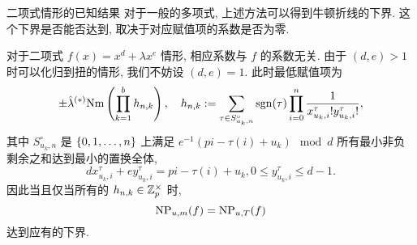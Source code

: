 \documentclass[aspectratio=169,handout]{ctexbeamer}
\newcommand\ldb{\llbracket}
\newcommand\rdb{\rrbracket}
\begin{document}



\begin{frame}{二项式情形的已知结果}
对于一般的多项式, 上述方法可以得到牛顿折线的下界.
这个下界是否能否达到, 取决于对应赋值项的系数是否为零.

对于二项式 $f(x)=x^d+\lambda x^e$ 情形, 相应系数与 $f$ 的系数无关.
由于 $(d,e)>1$ 时可以化归到扭的情形, 我们不妨设 $(d,e)=1$.
此时最低赋值项为
	\[\pm\hat\lambda^{(*)}{\mathrm{Nm}}\left(\prod_{k=1}^b h_{n,k}\right),\quad
	h_{n,k}:=\sum_{\tau\in S_{u_k,n}^\circ}\operatorname{sgn}(\tau)\prod_{i=0}^n\frac{1}{x_{u_k,i}^\tau!y_{u_k,i}^\tau!},
	\]
其中 $S_{u_k,n}^\circ$ 是 ${\left\{0,1,\dots,n\right\}}$ 上满足 $e^{-1}(pi-\tau(i)+u_k)\mod d$ 所有最小非负剩余之和达到最小的置换全体,
	\[dx_{u_k,i}^\tau+ey_{u_k,i}^\tau=pi-\tau(i)+u_k,0\le y_{u_k,i}^\tau\le d-1.\]
因此当且仅当所有的 $h_{n,k}\in{\mathbb{Z}}_p^\times$ 时,
	\[{\mathrm{NP}}_{u,m}(f)={\mathrm{NP}}_{u,T}(f)\]
达到应有的下界.
\end{frame}
\end{document}
